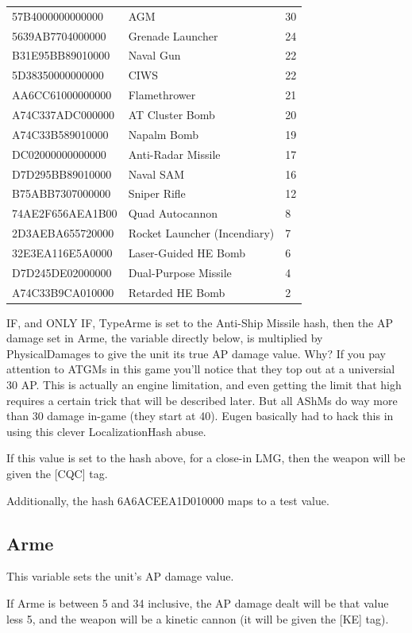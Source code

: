 \documentclass{article}
\begin{document}
\begin{center}
\begin{tabular}{ | l | l | l |}
	57B4000000000000 & AGM & 30\\
	5639AB7704000000 & Grenade Launcher & 24\\
	B31E95BB89010000 & Naval Gun & 22\\
	5D38350000000000 & CIWS & 22\\
	AA6CC61000000000 & Flamethrower & 21\\
	A74C337ADC000000 & AT Cluster Bomb & 20\\
	A74C33B589010000 & Napalm Bomb & 19\\
	DC02000000000000 & Anti-Radar Missile & 17\\
	D7D295BB89010000 & Naval SAM & 16\\
	B75ABB7307000000 & Sniper Rifle & 12\\
	74AE2F656AEA1B00 & Quad Autocannon & 8\\	
	2D3AEBA655720000 & Rocket Launcher (Incendiary) & 7\\
	32E3EA116E5A0000 & Laser-Guided HE Bomb & 6\\
	D7D245DE02000000 & Dual-Purpose Missile & 4\\
	A74C33B9CA010000 & Retarded HE Bomb & 2\\
    \hline
    \end{tabular}
\end{center}

IF, and ONLY IF, TypeArme is set to the Anti-Ship Missile hash, then the AP damage set in Arme, the variable directly below, is multiplied by PhysicalDamages to give the unit its true AP damage value. Why? If you pay attention to ATGMs in this game you'll notice that they top out at a universial 30 AP. This is actually an engine limitation, and even getting the limit that high requires a certain trick that will be described later. But all AShMs do way more than 30 damage in-game (they start at 40). Eugen basically had to hack this in using this clever LocalizationHash abuse.

If this value is set to the hash above, for a close-in LMG, then the weapon will be given the [CQC] tag.

Additionally, the hash 	6A6ACEEA1D010000 maps to a test value.

\subsection{Arme}

This variable sets the unit's AP damage value.

If Arme is between 5 and 34 inclusive, the AP damage dealt will be that value less 5, and the weapon will be a kinetic cannon (it will be given the [KE] tag).
\end{document}
